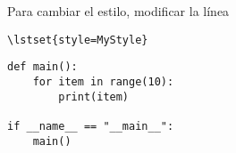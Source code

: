 Para cambiar el estilo, modificar la línea 
\begin{verbatim}
\lstset{style=MyStyle}
\end{verbatim}

\begin{lstlisting}
def main():
    for item in range(10):
        print(item)

if __name__ == "__main__":
    main()
\end{lstlisting}







\clearpage
\printbibliography



